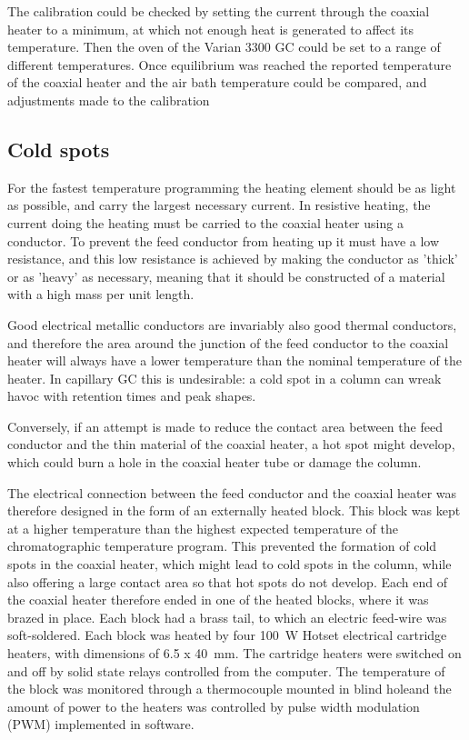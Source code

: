 The calibration could be checked by setting the current through the coaxial
heater to a minimum, at which not enough heat is generated to affect its
temperature. Then the oven of the Varian 3300 GC could be set to a range of
different temperatures. Once equilibrium was reached the reported temperature of
the coaxial heater and the air bath temperature could be compared, and
adjustments made to the calibration

\subsection{Cold spots}
\label{sec:ColdSpots}

For the fastest temperature programming the heating element should be as light
as possible, and carry the largest necessary current. In resistive heating, the
current doing the heating must be carried to the coaxial heater using a
conductor. To prevent the feed conductor from heating up it must have a low
resistance, and this low resistance is achieved by making the conductor as
'thick' or as 'heavy' as necessary, meaning that it should be constructed of a
material with a high mass per unit length.

Good electrical metallic conductors are invariably also good thermal conductors,
and therefore the area around the junction of the feed conductor to the coaxial
heater will always have a lower temperature than the nominal temperature of the
heater. In capillary GC this is undesirable: a cold spot in a column can wreak
havoc with retention times and peak shapes.

Conversely, if an attempt is made to reduce the contact area between the feed
conductor and the thin material of the coaxial heater, a hot spot might develop,
which could burn a hole in the coaxial heater tube or damage the column.

The electrical connection between the feed conductor and the coaxial heater was
therefore designed in the form of an externally heated block. This block was
kept at a higher temperature than the highest expected temperature of the
chromatographic temperature program. This prevented the formation of cold spots
in the coaxial heater, which might lead to cold spots in the column, while also
offering a large contact area so that hot spots do not develop. Each end of the
coaxial heater therefore ended in one of the heated blocks, where it was brazed
in place. Each block had a brass tail, to which an electric feed-wire was
soft-soldered. Each block was heated by four \SI{100}{\watt}
Hotset\texttrademark{} electrical cartridge heaters, with dimensions of \SI{6.5
x 40}{\milli\metre}. The cartridge heaters were switched on and off by solid
state relays controlled from the computer. The temperature of the block was
monitored through a thermocouple mounted in blind holeand the amount of power to
the heaters was controlled by pulse width modulation (PWM) implemented in
software.
 
